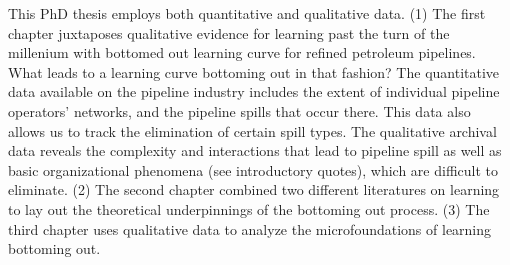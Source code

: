 This PhD thesis employs both quantitative and qualitative data. (1) The first chapter juxtaposes qualitative evidence for learning past the turn of the millenium with bottomed out learning curve for refined petroleum pipelines. What leads to a learning curve bottoming out in that fashion? The quantitative data available on the pipeline industry includes the extent of individual pipeline operators' networks, and the pipeline spills that occur there. This data also allows us to track the elimination of certain spill types. The qualitative archival data reveals the complexity and interactions that lead to pipeline spill as well as basic organizational phenomena (see introductory quotes), which are difficult to eliminate. (2) The second chapter combined two different literatures on learning to lay out the theoretical underpinnings of the bottoming out process. (3) The third chapter uses qualitative data to analyze the microfoundations of learning bottoming out.